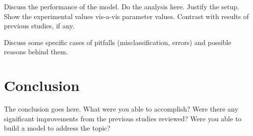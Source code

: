 \documentclass[conference]{IEEEtran}
\begin{document}
Discuss the performance of the model. Do the analysis here. Justify the setup. Show the experimental values vis-a-vis parameter values. Contrast with results of previous studies, if any. 

Discuss some specific cases of pitfalls (misclassification, errors) and possible reasons behind them.
\section{Conclusion}
The conclusion goes here. What were you able to accomplish? Were there any significant improvements from the previous studies reviewed? Were you able to build a model to address the topic?





\end{document}
